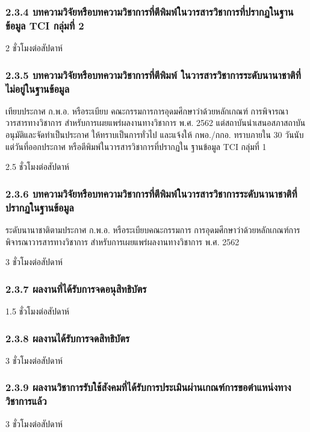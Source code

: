 \documentclass[a4paper,12pt,english]{sphinxmanual}
\begin{document}
\subsubsection{2.3.4 บทความวิจัยหรือบทความวิชาการที่ตีพิมพ์ในวารสารวิชาการที่ปรากฏในฐานข้อมูล TCI กลุ่มที่ 2}
\label{\detokenize{workload_rubric:tci-2}}
2 ชั่วโมงต่อสัปดาห์


\subsubsection{2.3.5 บทความวิจัยหรือบทความวิชาการที่ตีพิมพ์ ในวารสารวิชาการระดับนานาชาติที่ไม่อยู่ในฐานข้อมูล}
\label{\detokenize{workload_rubric:id36}}
เทียบประกาศ ก.พ.อ. หรือระเบียบ คณะกรรมการการอุดมศึกษาว่าด้วยหลักเกณฑ์ การพิจารณาวารสารทางวิชาการ สำหรับการเผยแพร่ผลงานทางวิชาการ พ.ศ. 2562 แต่สถาบันนำเสนอสภาสถาบันอนุมัติและจัดทำเป็นประกาศ ให้ทราบเป็นการทั่วไป และแจ้งให้ กพอ./กกอ. ทราบภายใน 30 วันนับแต่วันที่ออกประกาศ หรือตีพิมพ์ในวารสารวิชาการที่ปรากฏใน ฐานข้อมูล TCI กลุ่มที่ 1

2.5 ชั่วโมงต่อสัปดาห์


\subsubsection{2.3.6 บทความวิจัยหรือบทความวิชาการที่ตีพิมพ์ในวารสารวิชาการระดับนานาชาติที่ปรากฏในฐานข้อมูล}
\label{\detokenize{workload_rubric:id37}}
ระดับนานาชาติตามประกาศ ก.พ.อ. หรือระเบียบคณะกรรมการ การอุดมศึกษาว่าด้วยหลักเกณฑ์การพิจารณาวารสารทางวิชาการ สำหรับการเผยแพร่ผลงานทางวิชาการ พ.ศ. 2562

3 ชั่วโมงต่อสัปดาห์


\subsubsection{2.3.7 ผลงานที่ได้รับการจดอนุสิทธิบัตร}
\label{\detokenize{workload_rubric:id38}}
1.5 ชั่วโมงต่อสัปดาห์


\subsubsection{2.3.8 ผลงานได้รับการจดสิทธิบัตร}
\label{\detokenize{workload_rubric:id39}}
3 ชั่วโมงต่อสัปดาห์


\subsubsection{2.3.9 ผลงานวิชาการรับใช้สังคมที่ได้รับการประเมินผ่านเกณฑ์การขอตำแหน่งทางวิชาการแล้ว}
\label{\detokenize{workload_rubric:id40}}
3 ชั่วโมงต่อสัปดาห์
\end{document}
